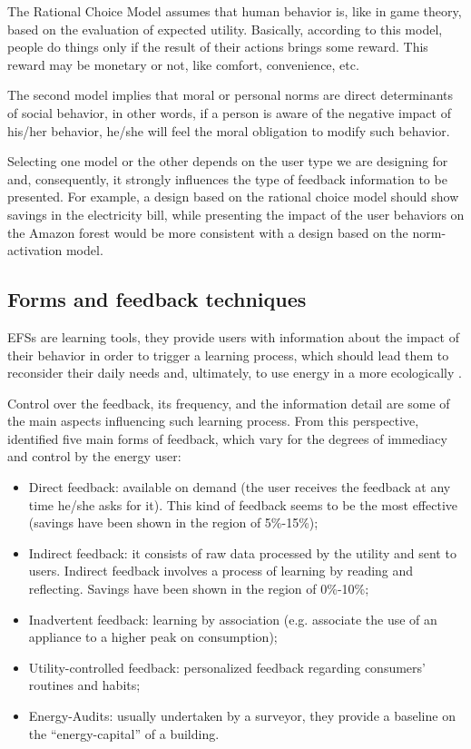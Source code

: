 The Rational Choice Model assumes that human behavior is, like in game theory, based on the evaluation of expected utility. Basically, according to this model, people do things only if the result of their actions brings some reward. This reward may be monetary or not, like comfort, convenience, etc.


The second model implies that moral or personal norms are direct determinants of social behavior, in other words, if a person is aware of the negative impact of his/her behavior, he/she will feel the moral obligation to modify such behavior.


Selecting one model or the other depends on the user type we are designing for and, consequently, it strongly influences the type of feedback information to be presented. For example, a design based on the rational choice model should show savings in the electricity bill, while presenting the impact of the user behaviors on the Amazon forest would be more consistent with a design based on the norm-activation model.

\subsection{Forms and feedback techniques}

\acp{EFS} are learning tools, they provide users with information about the impact of their behavior in order to trigger a learning process, which should lead them to reconsider their daily needs and, ultimately, to use energy in a more ecologically \cite{DesigningFeedback}.


Control over the feedback, its frequency, and the information detail are some of the main aspects influencing such learning process. From this perspective, \cite{Darby2006, DesigningFeedback} identified five main forms of feedback, which vary for the degrees of immediacy and control by the energy user:

\begin{itemize}
    \item Direct feedback: available on demand (the user receives the feedback at any time he/she asks for it). This kind of feedback seems to be the most effective (savings have been shown in the region of 5\%-15\%);
    \item Indirect feedback: it consists of raw data processed by the utility and sent to users. Indirect feedback involves a process of learning by reading and reflecting. Savings have been shown in the region of 0\%-10\%;
    \item Inadvertent feedback: learning by association (e.g. associate the use of an appliance to a higher peak on consumption);
    \item Utility-controlled feedback: personalized feedback regarding consumers’ routines and habits;
    \item  Energy-Audits: usually undertaken by a surveyor, they provide a baseline on the “energy-capital” of a building.
\end{itemize}


